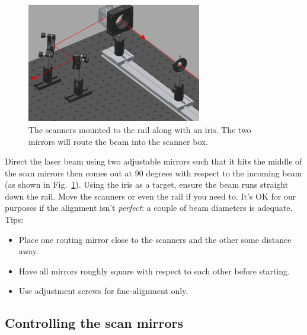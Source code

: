 \documentclass[a4paper]{report}
\begin{document}
\begin{figure}[h]
\centering
\includegraphics[width=3.0in]{InitialScannerSetup.eps}
\caption{The scanners mounted to the rail along with an iris. 
The two mirrors will route the beam into the scanner box.}
\label{scannersOnRail}
\end{figure}

\noindent
Direct the laser beam using two adjustable mirrors such that it hits the middle of the scan mirrors then comes out at 90 degrees with respect to the incoming beam (as shown in Fig.~\ref{scannersOnRail}). 
Using the iris as a target, ensure the beam runs straight down the rail. 
Move the scanners or even the rail if you need to.
It's OK for our purposes if the alignment isn't \textit{perfect}: a couple of beam diameters is adequate. 
Tips:
\begin{itemize}
\setlength\itemsep{0.15em}
\item Place one routing mirror close to the scanners and the other some distance away. 
\item Have all mirrors roughly square with respect to each other before starting.
\item Use adjustment screws for fine-alignment only.
\end{itemize}


\clearpage

\subsection{Controlling the scan mirrors}
\end{document}
